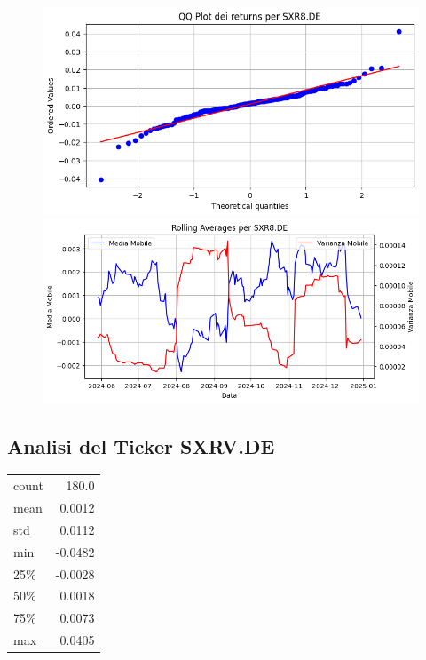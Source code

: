 \documentclass{article}%
\begin{document}
%


\begin{figure}[htbp]%
\begin{minipage}{0.48\textwidth}%
\includegraphics[width=\linewidth]{immagini_tickers/SXR8.DE_qq_plot.png}%
\end{minipage}%
\begin{minipage}{0.48\textwidth}%
\includegraphics[width=\linewidth]{immagini_tickers/SXR8.DE_rolling_averages.png}%
\end{minipage}%
\end{figure}

%
\subsection*{Analisi del Ticker SXRV.DE}%
\label{subsec:AnalisidelTickerSXRV.DE}%
\begin{tabular}{lr}%
count&180.0\\%
mean&0.0012\\%
std&0.0112\\%
min&{-}0.0482\\%
25\%&{-}0.0028\\%
50\%&0.0018\\%
75\%&0.0073\\%
max&0.0405\\%
\end{tabular}%
\end{document}
